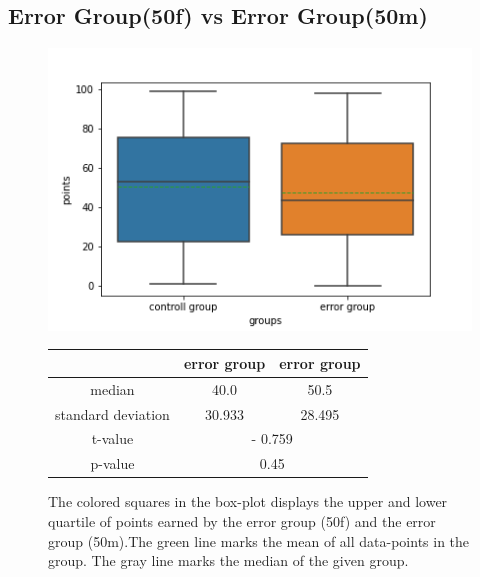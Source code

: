 \documentclass[runningheads]{llncs}
\begin{document}
\subsection{Error Group(50f) vs Error Group(50m)}
\begin{figure}
    \begin{minipage}{0.43\textwidth}        
        \includegraphics[width=\textwidth]{code/generate/all.png}
        \caption{The colored squares in the box-plot displays
        the upper and lower quartile of points earned by the error group (50f) and
        the error group (50m).The green line marks the mean of all data-points in the group.
        The gray line marks the median  of the given group.} \label{fig6}
    \end{minipage}
\hfill
\begin{minipage}{0.43\textwidth}
\begin{tabular}[]{| c | c | c |}
        \hline
        & error group & error group \\
        \hline
        median & 40.0&50.5 \\
        \hline
        standard deviation & 30.933&28.495 \\
        \hline
        t-value & \multicolumn{2}{c|}{- 0.759} \\
        \hline
        p-value & \multicolumn{2}{c|}{0.45} \\
        \hline            
\end{tabular}
\end{minipage}
\end{figure}
\end{document}

